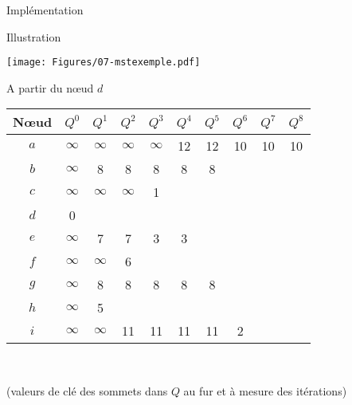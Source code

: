 \begin{frame}{Implémentation}

\begin{center}
{\small
{}
}
\end{center}

\end{frame}

\begin{frame}{Illustration}

\centerline{\texttt{[image: Figures/07-mstexemple.pdf]}}

A partir du n\oe ud $d$
\begin{center}\small
\begin{tabular}{cccccccccc}
N\oe ud  & $Q^0$ & $Q^1$ & $Q^2$ & $Q^3$ & $Q^4$ & $Q^5$ & $Q^6$ & $Q^7$ & $Q^8$\\
\hline
$a$ & $\infty$ & $\infty$& $\infty$& $\infty$ & 12 & 12 & 10 & 10 & 10\\
$b$ & $\infty$ & 8& 8 & 8 & 8 & 8\\%
$c$ & $\infty$ & $\infty$& $\infty$ & 1\\%
$d$ & 0 \\%
$e$ & $\infty$ & 7& 7 & 3 & 3\\%
$f$ & $\infty$ & $\infty$ & 6\\%
$g$ & $\infty$ & 8 & 8 & 8 & 8 & 8\\%
$h$ & $\infty$ & 5\\%
$i$ & $\infty$ & $\infty$ & 11 & 11 & 11 & 11 & 2\\%
\end{tabular}\\

\medskip

{\footnotesize (valeurs de clé des sommets dans $Q$ au fur et à mesure des itérations)}
\end{center}


\end{frame}

